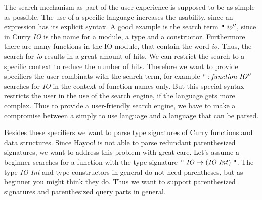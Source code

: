 \documentclass[%
	pdftex,%
	a4paper,%
	oneside,%
	chapterprefix,%
	headsepline,%
	12pt%
]{scrbook}
\newcommand{\Conid}[1]{\mathit{#1}}
\newcommand{\Varid}[1]{\mathit{#1}}
\begin{document}
The search mechanism as part of the user-experience is supposed to be
as simple as possible. %
The use of a specific language increases the usability, since an
expression has its explicit syntax. %
A good example is the search term \ensuremath{\text{\tt ''}\;\Varid{io''}}, since in Curry \emph{IO}
is the name for a module, a type and a constructor. %
Furthermore there are many functions in the IO module, that contain
the word \emph{io}. Thus, the search for \emph{io} results in a great
amount of hits. %
We can restrict the search to a specific context to reduce the number
of hits. %
Therefore we want to provide specifiers the user combinats with the
search term, for example \ensuremath{\text{\tt ''}\mathbin{:}\Varid{function}\;\Conid{IO''}} searches for \emph{IO} in
the context of function names only. %
But this special syntax restricts the user in the use of the search
engine, if the language gets more complex. %
Thus to provide a user-friendly search engine, we have to make a
compromise between a simply to use language and a language that can be
parsed. %

Besides these specifiers we want to parse type signatures of Curry
functions and data structures. %
Since Hayoo! is not able to parse redundant parenthesized signatures,
we want to address this problem with great care. Let's assume a
beginner searches for a function with the type signature \ensuremath{\text{\tt ''}\;\Conid{IO}\to (\Conid{IO}\;\Conid{Int})\;\text{\tt ''}}. %
The type \emph{IO Int} and type constructors in general do not need
parentheses, but as beginner you might think they do. %
Thus we want to support parenthesized signatures and parenthesized
query parts in general. %
\end{document}
